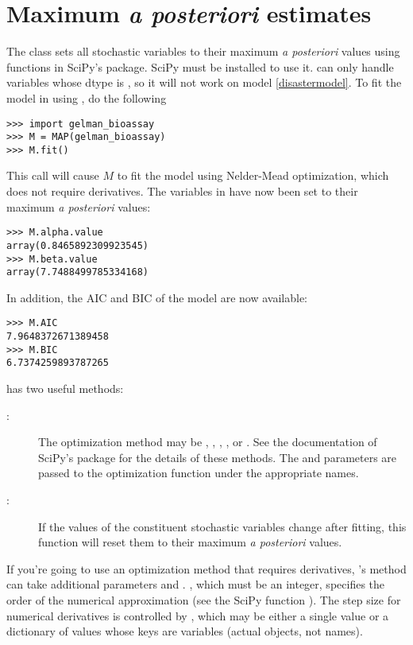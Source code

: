 \hypertarget{MAP}{}
\section{Maximum \emph{a posteriori} estimates} \label{sec:MAP}

The  class sets all stochastic variables to their maximum \emph{a posteriori} values using functions in SciPy's  package. SciPy must be installed to use it.  can only handle variables whose dtype is , so it will not work on model \ref{disastermodel}. To fit the model in  using , do the following
\begin{verbatim}
>>> import gelman_bioassay
>>> M = MAP(gelman_bioassay)
>>> M.fit()
\end{verbatim}
This call will cause $M$ to fit the model using Nelder-Mead optimization, which does not require derivatives. The variables in  have now been set to their maximum \emph{a posteriori} values:
\begin{verbatim}
>>> M.alpha.value
array(0.8465892309923545)
>>> M.beta.value
array(7.7488499785334168)
\end{verbatim}
In addition, the AIC and BIC of the model are now available:
\begin{verbatim}
>>> M.AIC
7.9648372671389458
>>> M.BIC
6.7374259893787265
\end{verbatim}

\bigskip
{} has two useful methods:
\begin{description}
    \item[:] The optimization method may be , , , , or . See the documentation of SciPy's  package for the details of these methods. The  and  parameters are passed to the optimization function under the appropriate names.
    \item[:] If the values of the constituent stochastic variables change after fitting, this function will reset them to their maximum \emph{a posteriori} values.
\end{description}
If you're going to use an optimization method that requires derivatives, 's  method can take additional parameters  and . , which must be an integer, specifies the order of the numerical approximation (see the SciPy function ). The step size for numerical derivatives is controlled by , which may be either a single value or a dictionary of values whose keys are variables (actual objects, not names).

